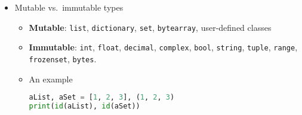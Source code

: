 \documentclass[a4paper,12pt,%
              final%
              ]{article}
\begin{document}
\begin{itemize}
\begin{itemize}
        \begin{itemize}
          \item \verb|"Hi, {0}! It's {1}".format('Bob','Alice')| (or \verb|{<n>:s}| for instance))
          \item \verb|"Hi, {v1}! It's {v2}".format(v1='Bob',v2='Alice')| (or \verb|{<var>:s}| for instance)
          \item \verb|d={'v1':'Bob','v2':'Alice'}; "Hi, {v1}! It's {v2}".format_map(d)| equivalent to above item
        \end{itemize}
      \item \texttt{f}-strings, \verb|f'[.]'|: \verb|who='Bob'; greet=f'Hi, {who}!'| (or \verb|greet = f'Hi, {who:s}!'|)
        \begin{itemize}
          \item \verb|v1='Bob'; v2='Alice'; greet="Hi, {v1}! It's {v2}"|
          \item Braces need to be escaped: e.g.\ \verb|fr'{3}'| gives \verb|3|,  \verb|fr'{{3}}'| gives \verb|{3}|. Moreover, with variables:
\begin{verbatim}
test = 'TEST'
print(f'This is a {test}')
# This is a TEST
print(f'This is a {{test}}')
# This is a {test}
print(f'This is a {{{test}}}') # 2 for escaping, 1 for variable
# This is a {TEST}
\end{verbatim}
        \end{itemize}
      \item Raw-strings: identified by \texttt{r}, the backslash is interpreted as backslash (automatically escaped). For instance, \verb|'\n'| leads to a newline, \verb|r'\n'| leads to \verb|\n|.
      \item Combine \texttt{f}- and \texttt{r}-strings: just use \verb|fr'...'|
    \end{itemize}
  \item Mutable vs.\ immutable types
    \begin{itemize}
      \item \textbf{Mutable}: \texttt{list}, \texttt{dictionary}, \texttt{set}, \texttt{bytearray}, user-defined classes
      \item \textbf{Immutable}: \texttt{int}, \texttt{float}, \texttt{decimal}, \texttt{complex}, \texttt{bool}, \texttt{string}, \texttt{tuple}, \texttt{range}, \texttt{frozenset}, \texttt{bytes}.
      \item An example
\begin{lstlisting}[language=python]
aList, aSet = [1, 2, 3], (1, 2, 3)
print(id(aList), id(aSet))

\end{lstlisting}
\end{itemize}
\end{itemize}
\end{document}
